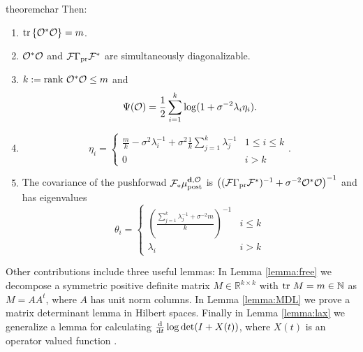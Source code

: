 \begin{restatable}{theorem}{char}
  Then:
  \begin{enumerate}
  \item  $\textup{tr}\left \{\mathcal{O}^*\mathcal{O} \right \} = m$.
  \item $\mathcal{O}^*\mathcal{O}$ and $\mathcal{F}\Gamma_{\textup{pr}}\mathcal{F}^*$ are simultaneously
    diagonalizable.
  \item $k := \textup{rank}\  \mathcal{O}^*\mathcal{O} \leq m$ and
    \begin{equation*}
      \tar(\obs) = \frac12 \sum_{i=1}^{k} \log (1 + \sigma^{-2}\lambda_i\eta_i). %
    \end{equation*}
  \item
    \begin{equation*}
        \eta_i = \begin{cases}
          \frac{m}{k} - \sigma^2 \lambda_i^{-1} + \sigma^2 \frac{1}{k} \sum_{j=1}^k \lambda_j^{-1} & 1 \leq i \leq k \\
          0 & i > k 
        \end{cases}.
    \end{equation*}
  \item The covariance of the pushforwad $\mathcal{F}_{*} \mu_{\textup{post}}^{\mathbf{d}, \mathcal{O}}$ is $\left (
    (\mathcal{F} \Gamma_{\textup{pr}} \mathcal{F}^*)^{-1} + \sigma^{-2} \mathcal{O}^*\mathcal{O} \right )^{-1}$
    and has eigenvalues
    \begin{equation*}
      \theta_i =
      \begin{cases}
        \left(\frac{\sum_{j=1}^k \lambda_j^{-1} + \sigma^{-2}m}{k} \right )^{-1} & i \leq k \\
        \lambda_i &  i > k 
      \end{cases}
    \end{equation*}
  \end{enumerate}
\end{restatable}

Other contributions include three useful lemmas: In Lemma
\ref{lemma:free} we decompose a symmetric positive definite matrix $M
\in \mathbb{R}^{k \times k}$ with $\textup{tr}\ M = m \in \mathbb{N}$ as $M =
AA^t$, where $A$ has unit norm columns. In Lemma \ref{lemma:MDL} we
prove a matrix determinant lemma in Hilbert spaces. Finally in Lemma
\ref{lemma:lax} we generalize a lemma for calculating
$\frac{\text{\textup{d}}}{\text{\textup{d}} t} \log \det (I + X(t))$, where $X(t)$ is an
operator valued function \cite{Lax07}.



